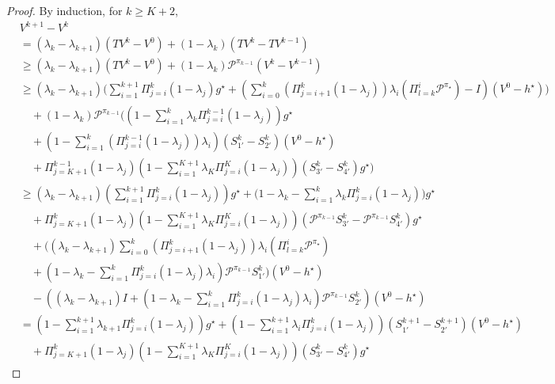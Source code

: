\documentclass[10pt,a4paper]{amsart}
\newcommand{\cP}{\mathcal{P}}
\newcommand*{\para}[1]{\left({#1}\right)}
\begin{document}
\begin{proof}
By induction, for $k\ge K+2$,
\begin{align*}
    &V^{k+1}-V^{k} 
    \\ &= (\lambda_{k}-\lambda_{k+1})(TV^{k} -V^{0})+(1-\lambda_{k})(TV^{k} -TV^{k-1})
     \\ & \ge (\lambda_{k}-\lambda_{k+1})(TV^{k} -V^{0})+(1-\lambda_{k})\cP^{\pi_{k-1}}(V^{k} -V^{k-1})
         \\ & \ge (\lambda_{k}-\lambda_{k+1}) \Bigg(\sum_{i=1}^{k+1} \Pi^{k}_{j=i} (1-\lambda_j)g^{\star}+\para{\sum_{i=0}^{k} (\Pi^k_{j=i+1} (1-\lambda_j)) \lambda_{i}\para{\Pi^{i}_{l=k}\cP^{\pi_{\star}}}-I}(V^0-h^{\star})\Bigg)
    \\& \quad + (1-\lambda_{k})\cP^{\pi_{k-1}}\Bigg(\para{1-\sum_{i=1}^{k} \lambda_k \Pi^{k-1}_{j=i} (1-\lambda_j)}g^{\star} 
    \\& \quad + \para{1-\sum_{i=1}^{k}  \para{\Pi^{k-1}_{j=i} (1-\lambda_j)}\lambda_i}(S^{k}_{1'} -S^{k}_{2'})(V^0-h^{\star})
    \\& \quad +\Pi^{k-1}_{j=K+1} (1-\lambda_j)\para{1-\sum_{i=1}^{K+1} \lambda_{K} \Pi^{K}_{j=i} (1-\lambda_j)}(S^{k}_{3'}-S^{k}_{4'})g^{\star}\Bigg)
    \\ & \ge (\lambda_{k}-\lambda_{k+1})\para{ \sum_{i=1}^{k+1} \Pi^{k}_{j=i} (1-\lambda_j)}g^{\star}+\Bigg(1-\lambda_k-\sum_{i=1}^{k} \lambda_{k}\Pi^{k}_{j=i} (1-\lambda_j)\Bigg)g^{\star}
    \\& \quad +\Pi^{k}_{j=K+1} (1-\lambda_j)\para{1-\sum_{i=1}^{K+1} \lambda_{K} \Pi^{K}_{j=i} (1-\lambda_j)}(\cP^{\pi_{k-1}}S^{k}_{3'}-\cP^{\pi_{k-1}}S^{k}_{4'})g^{\star}
             \\& \quad + \Bigg((\lambda_{k}-\lambda_{k+1})\sum_{i=0}^{k} (\Pi^k_{j=i+1} (1-\lambda_j)) \lambda_{i}\para{\Pi^{i}_{l=k}\cP^{\pi_{\star}}}
             \\& \quad +\para{1-\lambda_k-\sum_{i=1}^{k}  \Pi^{k}_{j=i} (1-\lambda_j)\lambda_i}\cP^{\pi_{k-1}}S^k_{1'}\Bigg)(V^0-h^{\star})
    \\& \quad - \para{(\lambda_{k}-\lambda_{k+1})I+\para{1-\lambda_k-\sum_{i=1}^{k}  \Pi^{k}_{j=i} (1-\lambda_j)\lambda_i}\cP^{\pi_{k-1}}S^{k}_{2'}}(V^0-h^{\star})
    \\& = \para{1-\sum_{i=1}^{k+1} \lambda_{k+1} \Pi^{k}_{j=i} (1-\lambda_j)}g^{\star} + \para{1-\sum_{i=1}^{k+1} \lambda_i \Pi^{k}_{j=i} (1-\lambda_j)}(S^{k+1}_{1 '}-S^{k+1}_{2'})(V^0-h^{\star})
    \\& \quad +\Pi^{k}_{j=K+1} (1-\lambda_j)\para{1-\sum_{i=1}^{K+1} \lambda_{K} \Pi^{K}_{j=i} (1-\lambda_j)}(S^{k}_{3'}-S^{k}_{4'})g^{\star}

\end{align*}
\end{proof}
\end{document}
